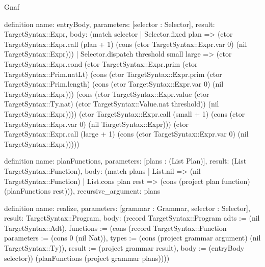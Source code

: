 \begin{lexlean}{Gnaf}
\begin{semanticmodule}
definition{
  name: entryBody,
  parameters: [selector : Selector],
  result: TargetSyntax::Expr,
  body: (match selector
    | Selector.fixed plan => (ctor TargetSyntax::Expr.call (plan + 1) (cons (ctor TargetSyntax::Expr.var 0) (nil TargetSyntax::Expr)))
    | Selector.dispatch threshold small large => (ctor TargetSyntax::Expr.cond (ctor TargetSyntax::Expr.prim (ctor TargetSyntax::Prim.natLt) (cons (ctor TargetSyntax::Expr.prim (ctor TargetSyntax::Prim.length) (cons (ctor TargetSyntax::Expr.var 0) (nil TargetSyntax::Expr))) (cons (ctor TargetSyntax::Expr.value (ctor TargetSyntax::Ty.nat) (ctor TargetSyntax::Value.nat threshold)) (nil TargetSyntax::Expr)))) (ctor TargetSyntax::Expr.call (small + 1) (cons (ctor TargetSyntax::Expr.var 0) (nil TargetSyntax::Expr))) (ctor TargetSyntax::Expr.call (large + 1) (cons (ctor TargetSyntax::Expr.var 0) (nil TargetSyntax::Expr)))))
}

definition{
  name: planFunctions,
  parameters: [plans : (List Plan)],
  result: (List TargetSyntax::Function),
  body: (match plans
    | List.nil => (nil TargetSyntax::Function)
    | List.cons plan rest => (cons (project plan function) (planFunctions rest))),
  recursive_argument: plans
}

definition{
  name: realize,
  parameters: [grammar : Grammar, selector : Selector],
  result: TargetSyntax::Program,
  body: (record TargetSyntax::Program {adts := (nil TargetSyntax::Adt), functions := (cons (record TargetSyntax::Function {parameters := (cons 0 (nil Nat)), types := (cons (project grammar argument) (nil TargetSyntax::Ty)), result := (project grammar result), body := (entryBody selector)}) (planFunctions (project grammar plans)))})
}


\end{semanticmodule}
\end{lexlean}
